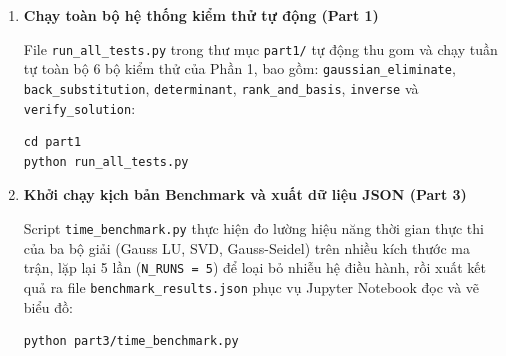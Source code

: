 \begin{enumerate}
    \textit{Phần 1 -- Khử Gauss và các ứng dụng:}
\begin{tcolorbox}[mycodebox]
\begin{verbatim}
python part1/gaussian.py
python part1/back_substitution.py
python part1/determinant.py
python part1/inverse.py
python part1/rank_basis.py
python part1/verify_solution.py
\end{verbatim}
\end{tcolorbox}

    \textit{Phần 1 -- Chạy toàn bộ test:}

\begin{tcolorbox}[mycodebox]
\begin{verbatim}
python part1/run_all_tests.py
\end{verbatim}
\end{tcolorbox}

    \textit{Phần 2 -- Chéo hóa và Phân rã SVD:}
\begin{tcolorbox}[mycodebox]
\begin{verbatim}
python part2/decomposition.py
python part2/diagonalization.py
\end{verbatim}
\end{tcolorbox}

    \item \textbf{Chạy toàn bộ hệ thống kiểm thử tự động (Part 1)}

    File \texttt{run\_all\_tests.py} trong thư mục \texttt{part1/} tự động thu gom và chạy
    tuần tự toàn bộ 6 bộ kiểm thử của Phần 1, bao gồm:
    \texttt{gaussian\_eliminate}, \texttt{back\_substitution}, \texttt{determinant},
    \texttt{rank\_and\_basis}, \texttt{inverse} và \texttt{verify\_solution}:
\begin{tcolorbox}[mycodebox]
\begin{verbatim}
cd part1
python run_all_tests.py
\end{verbatim}
\end{tcolorbox}

    \item \textbf{Khởi chạy kịch bản Benchmark và xuất dữ liệu JSON (Part 3)}

    Script \texttt{time\_benchmark.py} thực hiện đo lường hiệu năng thời gian thực thi
    của ba bộ giải (Gauss LU, SVD, Gauss-Seidel) trên nhiều kích thước ma trận,
    lặp lại 5 lần (\texttt{N\_RUNS = 5}) để loại bỏ nhiễu hệ điều hành, rồi xuất kết quả
    ra file \texttt{benchmark\_results.json} phục vụ Jupyter Notebook đọc và vẽ biểu đồ:
\begin{tcolorbox}[mycodebox]
\begin{verbatim}
python part3/time_benchmark.py
\end{verbatim}
\end{tcolorbox}


\end{enumerate}
